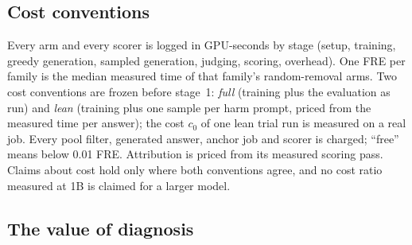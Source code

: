 \documentclass{article}
\theoremstyle{plain}
\theoremstyle{definition}
\theoremstyle{remark}
\begin{document}
\subsection{Cost conventions}
\label{app:cost}

Every arm and every scorer is logged in GPU-seconds by stage (setup, training,
greedy generation, sampled generation, judging, scoring, overhead). One FRE
per family is the median measured time of that family's random-removal arms.
Two cost conventions are frozen before stage~1: \emph{full} (training plus the
evaluation as run) and \emph{lean} (training plus one sample per harm prompt,
priced from the measured time per answer); the cost $c_0$ of one lean trial
run is measured on a real job. Every pool filter, generated answer, anchor job
and scorer is charged; ``free'' means below 0.01 FRE. Attribution is priced
from its measured scoring pass. Claims about cost hold only where both
conventions agree, and no cost ratio measured at 1B is claimed for a larger
model.

\subsection{The value of diagnosis}
\label{app:value}
\end{document}
